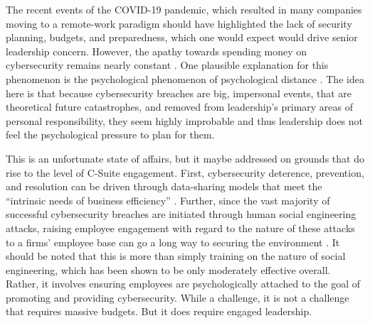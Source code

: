 The recent events of the COVID-19 pandemic, which resulted in many companies moving to a remote-work paradigm should have highlighted the lack of security planning, budgets, and preparedness, which one would expect would drive senior leadership concern. However, the apathy towards spending money on cybersecurity remains nearly constant \parencite{CyberattacksRiseStagnant2021}. One plausible explanation for this phenomenon is the psychological phenomenon of psychological distance \parencite{bendellHowFearLooming2020}. The idea here is that because cybersecurity breaches are big, impersonal events, that are theoretical future catastrophes, and removed from leadership's primary areas of personal responsibility, they seem highly improbable and thus leadership does not feel the psychological pressure to plan for them.

This is an unfortunate state of affairs, but it maybe addressed on grounds that do rise to the level of C-Suite engagement. First, cybersecurity deterence, prevention, and resolution can be driven through data-sharing models that meet the ``intrinsic needs of business efficiency'' \parencite{wangDrivingCybersecurityPolicy2020}. Further, since the vast majority of successful cybersecurity breaches are initiated through human social engineering attacks, raising employee engagement with regard to the nature of these attacks to a firms' employee base can go a long way to securing the environment \parencite{alshaikhAwarenessInfluenceModel2021}. It should be noted that this is more than simply training on the nature of social engineering, which has been shown to be only moderately effective overall. Rather, it involves ensuring employees are psychologically attached to the goal of promoting and providing cybersecurity. While a challenge, it is not a challenge that requires massive budgets. But it does require engaged leadership.
